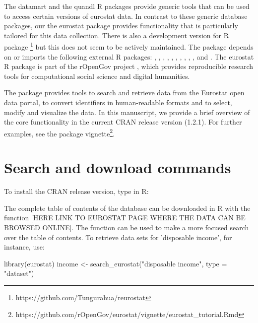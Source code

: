 The datamart \citep{datamart} and the quandl
\citep{quandl} R packages provide generic tools that can be used to access
certain versions of eurostat data. In contrast to these generic
database packages, our the eurostat package provides functionality
that is particularly tailored for this data collection. There is also
a development version for R package
\footnote{https://github.com/Tungurahua/reurostat} but this
does not seem to be actively maintained. The package
depends on or imports the following external R packages:
 \citep{devtools},  \citep{dplyr},
 \citep{knitr},  \citep{ggplot2},
 \citep{mapproj},  \citep{plotrix},
 \citep{reshape2}, 
\citep{rmarkdown},  \citep{stringi},
 \citep{testthat}, and 
\citep{tidyr}. The eurostat R package is
part of the rOpenGov project
\citep{Lahti13icml}, which provides reproducible research tools for
computational social science and digital humanities.


The package provides tools to search and retrieve data from the
Eurostat open data portal, to convert identifiers in human-readable
formats and to select, modify and visualize the data. In this
manuscript, we provide a brief overview of the core functionality in
the current CRAN release version (1.2.1). For further examples, see
the package
vignette\footnote{https://github.com/rOpenGov/eurostat/vignette/eurostat\_tutorial.Rmd}.



\section{Search and download commands}

To install the CRAN release version, type in R:


The complete table of contents of the database can be downloaded in R
with the function  [HERE LINK TO EUROSTAT
PAGE WHERE THE DATA CAN BE BROWSED ONLINE]. The
function  can be used to make a more focused
search over the table of contents. To retrieve data sets for
'disposable income', for instance, use:

\begin{example}
library(eurostat)
income <- search_eurostat("disposable income", type = "dataset")
\end{example}


